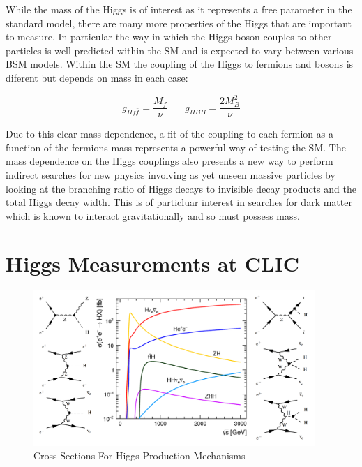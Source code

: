 While the mass of the Higgs is of interest as it represents a free parameter in the standard model, there are many more properties of the Higgs that are important to measure. In particular the way in which the Higgs boson couples to other particles is well predicted within the \ac{SM} and is expected to vary between various \ac{BSM} models. Within the \ac{SM} the coupling of the Higgs to fermions and bosons is diferent but depends on mass in each case:


\begin{equation}
g_{Hf\bar{f}}=\frac{M_f}{\nu} ~~~~~~~~    g_{HBB}=\frac{2M_B^2}{\nu} 
\end{equation}

Due to this clear mass dependence, a fit of the coupling to each fermion as a function of the fermions mass represents a powerful way of testing the \ac{SM}. The mass dependence on the Higgs couplings also presents a new way to perform indirect searches for new physics involving as yet unseen massive particles by looking at the branching ratio of Higgs decays to invisible decay products and the total Higgs decay width. This is of particluar interest in searches for dark matter which is known to interact gravitationally and so must possess mass. 

\section{Higgs Measurements at CLIC}
\begin{figure}
  \centering
  \includegraphics[width=0.95\textwidth,keepaspectratio]{Theory/fig/HiggsProcessesExtra.png}
  \caption[Cross Sections For Higgs Production Mechanisms]{Cross Sections For Higgs Production Mechanisms \cite{Abramowicz:2016zbo}}
  \label{fig:higgsXSecs}
\end{figure}


